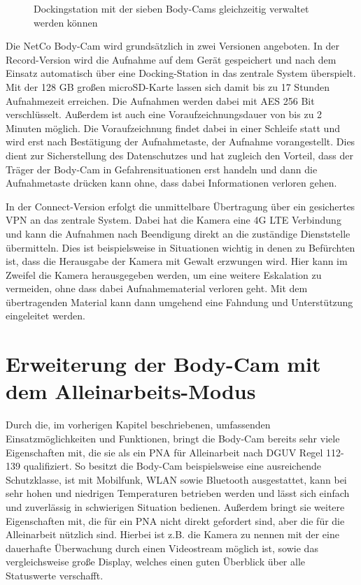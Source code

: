 \documentclass[thesis.tex]{subfiles}
\begin{document}
\begin{figure}[h]
    \centering
    \qquad
    \caption{Dockingstation mit der sieben Body-Cams gleichzeitig verwaltet werden können}
    \label{fig:BC_docking_7}
\end{figure}

Die NetCo Body-Cam wird grundsätzlich in zwei Versionen angeboten.
In der Record-Version wird die Aufnahme auf dem Gerät gespeichert und nach dem Einsatz automatisch über eine Docking-Station in das zentrale System überspielt.
Mit der 128 GB großen microSD-Karte lassen sich damit bis zu 17 Stunden Aufnahmezeit erreichen.
Die Aufnahmen werden dabei mit AES 256 Bit verschlüsselt.
Außerdem ist auch eine Voraufzeichnungsdauer von bis zu 2 Minuten möglich.
Die Voraufzeichnung findet dabei in einer Schleife statt und wird erst nach Bestätigung der Aufnahmetaste, der Aufnahme vorangestellt.
Dies dient zur Sicherstellung des Datenschutzes und hat zugleich den Vorteil, dass der Träger der Body-Cam in Gefahrensituationen erst handeln und dann die Aufnahmetaste drücken kann ohne, dass dabei Informationen verloren gehen.

In der Connect-Version erfolgt die unmittelbare Übertragung über ein gesichertes VPN an das zentrale System.
Dabei hat die Kamera eine 4G LTE Verbindung und kann die Aufnahmen nach Beendigung direkt an die zuständige Dienststelle übermitteln.
Dies ist beispielsweise in Situationen wichtig in denen zu Befürchten ist, dass die Herausgabe der Kamera mit Gewalt erzwungen wird.
Hier kann im Zweifel die Kamera herausgegeben werden, um eine weitere Eskalation zu vermeiden, ohne dass dabei Aufnahmematerial verloren geht.
Mit dem übertragenden Material kann dann umgehend eine Fahndung und Unterstützung eingeleitet werden.

\section{Erweiterung der Body-Cam mit dem Alleinarbeits-Modus}

Durch die, im vorherigen Kapitel beschriebenen, umfassenden Einsatzmöglichkeiten und Funktionen, bringt die Body-Cam bereits sehr viele Eigenschaften mit, die sie als ein PNA für Alleinarbeit nach DGUV Regel 112-139 \cite[]{Regel_112-139} qualifiziert.
So besitzt die Body-Cam beispielsweise eine ausreichende Schutzklasse, ist mit Mobilfunk, WLAN sowie Bluetooth ausgestattet, kann bei sehr hohen und niedrigen Temperaturen betrieben werden und lässt sich einfach und zuverlässig in schwierigen Situation bedienen.
Außerdem bringt sie weitere Eigenschaften mit, die für ein PNA nicht direkt gefordert sind, aber die für die Alleinarbeit nützlich sind.
Hierbei ist z.B. die Kamera zu nennen mit der eine dauerhafte Überwachung durch einen Videostream möglich ist, sowie das vergleichsweise große Display, welches einen guten Überblick über alle Statuswerte verschafft.
\end{document}
